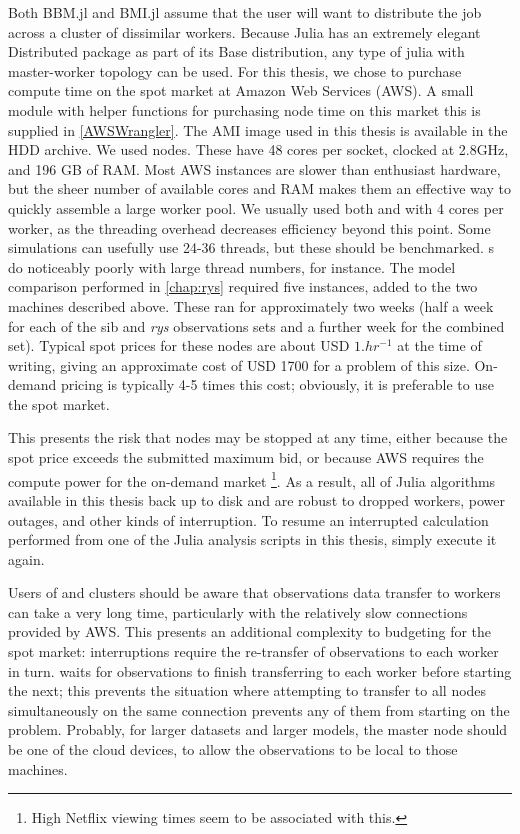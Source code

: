 \documentclass{ut-thesis}
\begin{document}
\begin{NoHyper}
Both BBM.jl and BMI.jl assume that the user will want to distribute the job across a cluster of dissimilar workers. Because Julia has an extremely elegant Distributed package as part of its Base distribution, any type of julia  with master-worker topology can be used. For this thesis, we chose to purchase compute time on the spot market at Amazon Web Services (AWS). A small module with helper functions for purchasing node time on this market this is supplied in \autoref{AWSWrangler}. The AMI image used in this thesis is available in the HDD archive. We used  nodes. These have 48 cores per socket, clocked at 2.8GHz, and 196 GB of RAM. Most AWS instances are slower than enthusiast hardware, but the sheer number of available cores and RAM makes them an effective way to quickly assemble a large worker pool. We usually used both  and  with 4 cores per worker, as the threading overhead decreases efficiency beyond this point. Some  simulations can usefully use 24-36 threads, but these should be benchmarked. s do noticeably poorly with large thread numbers, for instance. The model comparison performed in \autoref{chap:rys} required five  instances, added to the two machines described above. These ran for approximately two weeks (half a week for each of the sib and \textit{rys} observations sets and a further week for the combined set). Typical spot prices for these nodes are about USD $1.hr^{-1}$ at the time of writing, giving an approximate cost of USD 1700 for a problem of this size. On-demand pricing is typically 4-5 times this cost; obviously, it is preferable to use the spot market.

This presents the risk that nodes may be stopped at any time, either because the spot price exceeds the submitted maximum bid, or because AWS requires the compute power for the on-demand market \footnote{High Netflix viewing times seem to be associated with this.}. As a result, all of Julia algorithms available in this thesis back up to disk and are robust to dropped workers, power outages, and other kinds of interruption. To resume an interrupted calculation performed from one of the Julia analysis scripts in this thesis, simply execute it again.

Users of  and  clusters should be aware that observations data transfer to workers can take a very long time, particularly with the relatively slow connections provided by AWS. This presents an additional complexity to budgeting for the spot market: interruptions require the re-transfer of observations to each worker in turn.  waits for observations to finish transferring to each worker before starting the next; this prevents the situation where attempting to transfer to all nodes simultaneously on the same connection prevents any of them from starting on the problem. Probably, for larger datasets and larger models, the master node should be one of the cloud devices, to allow the observations to be local to those machines.

\end{NoHyper}
\end{document}
